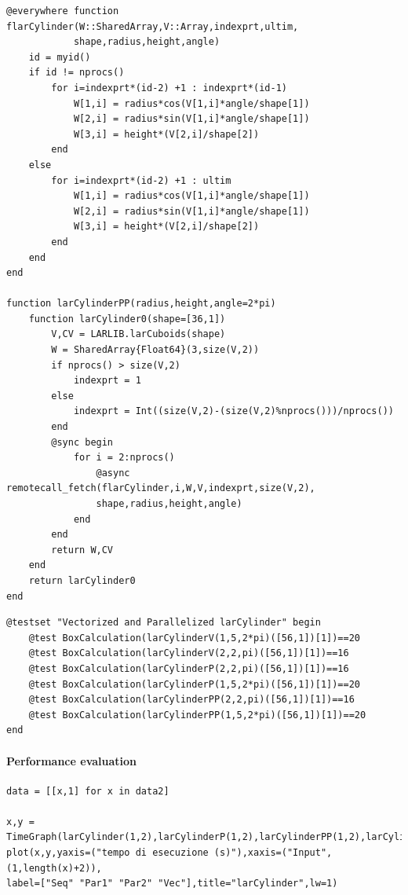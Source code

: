 \documentclass{article}
\begin{document}
\begin{Verbatim}
@everywhere function flarCylinder(W::SharedArray,V::Array,indexprt,ultim,
            shape,radius,height,angle)
    id = myid()
    if id != nprocs()
        for i=indexprt*(id-2) +1 : indexprt*(id-1)
            W[1,i] = radius*cos(V[1,i]*angle/shape[1])
            W[2,i] = radius*sin(V[1,i]*angle/shape[1])
            W[3,i] = height*(V[2,i]/shape[2]) 
        end
    else
        for i=indexprt*(id-2) +1 : ultim
            W[1,i] = radius*cos(V[1,i]*angle/shape[1])
            W[2,i] = radius*sin(V[1,i]*angle/shape[1])
            W[3,i] = height*(V[2,i]/shape[2])
        end
    end
end

function larCylinderPP(radius,height,angle=2*pi)
    function larCylinder0(shape=[36,1])
        V,CV = LARLIB.larCuboids(shape)
        W = SharedArray{Float64}(3,size(V,2))
        if nprocs() > size(V,2)
            indexprt = 1
        else
            indexprt = Int((size(V,2)-(size(V,2)%nprocs()))/nprocs())
        end
        @sync begin
            for i = 2:nprocs()
                @async remotecall_fetch(flarCylinder,i,W,V,indexprt,size(V,2),
                shape,radius,height,angle)
            end
        end
        return W,CV
    end
    return larCylinder0
end 
\end{Verbatim}

\begin{Verbatim}
@testset "Vectorized and Parallelized larCylinder" begin
    @test BoxCalculation(larCylinderV(1,5,2*pi)([56,1])[1])==20
    @test BoxCalculation(larCylinderV(2,2,pi)([56,1])[1])==16
    @test BoxCalculation(larCylinderP(2,2,pi)([56,1])[1])==16
    @test BoxCalculation(larCylinderP(1,5,2*pi)([56,1])[1])==20
    @test BoxCalculation(larCylinderPP(2,2,pi)([56,1])[1])==16
    @test BoxCalculation(larCylinderPP(1,5,2*pi)([56,1])[1])==20
end
\end{Verbatim}

\paragraph{Performance evaluation}

\begin{Verbatim}
data = [[x,1] for x in data2]

x,y = TimeGraph(larCylinder(1,2),larCylinderP(1,2),larCylinderPP(1,2),larCylinderV(1,2),data,5)
plot(x,y,yaxis=("tempo di esecuzione (s)"),xaxis=("Input",(1,length(x)+2)),
label=["Seq" "Par1" "Par2" "Vec"],title="larCylinder",lw=1) 

\end{Verbatim}
\end{document}
